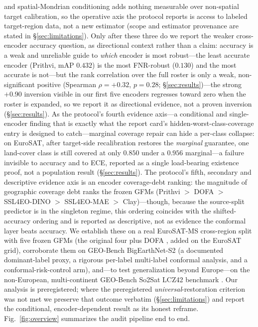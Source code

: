 \documentclass[preprint,11pt,authoryear]{elsarticle}
\begin{document}
and spatial-Mondrian conditioning adds nothing measurable over non-spatial target calibration, so the
operative axis the protocol reports is access to labeled target-region data, not a new estimator (scope
and estimator provenance are stated in \S\ref{sec:limitations}). Only after these three do we report the
weaker cross-encoder accuracy question, as directional context rather than a claim: accuracy is a weak and
unreliable guide to \emph{which} encoder is most robust---the least accurate encoder (Prithvi, mAP $0.432$)
is the most FNR-robust ($0.130$) and the most accurate is not---but the rank correlation over the full
roster is only a weak, non-significant positive (Spearman $\rho=+0.32$, $p{=}0.28$;
\S\ref{sec:results})---the strong $+0.90$ inversion visible in our first five encoders regresses
toward zero when the roster is expanded, so we report it as directional evidence, not a proven inversion
(\S\ref{sec:results}). As the protocol's fourth evidence axis---a conditional and single-encoder finding
that is exactly what the report card's hidden-worst-class-coverage entry is designed to catch---marginal
coverage repair can hide a per-class collapse: on EuroSAT, after target-side recalibration restores the
\emph{marginal} guarantee, one land-cover class is still covered at only $0.850$ under a $0.956$
marginal---a failure invisible to accuracy and to ECE, reported as a single load-bearing existence proof,
not a population result (\S\ref{sec:results}). The protocol's fifth, secondary and descriptive evidence
axis is an encoder coverage-debt ranking: the magnitude of geographic coverage debt ranks the frozen GFMs
(Prithvi $>$ DOFA \citep{xiong2024dofa} $>$ SSL4EO-DINO $>$ SSL4EO-MAE $>$ Clay)---though, because the
source-split predictor is in the singleton regime, this ordering coincides with the shifted-accuracy
ordering and is reported as descriptive, not as evidence the conformal layer beats accuracy. We establish
these on a real EuroSAT-MS \citep{helber2019eurosat} cross-region split with five frozen GFMs (the
original four plus DOFA \citep{xiong2024dofa}, added on the EuroSAT grid), corroborate them on GEO-Bench
BigEarthNet-S2 \citep{lacoste2023geobench,sumbul2019bigearthnet} (a documented dominant-label proxy, a
rigorous per-label multi-label conformal analysis, and a conformal-risk-control arm), and---to test
generalization beyond Europe---on the non-European, multi-continent GEO-Bench So2Sat LCZ42 benchmark
\citep{zhu2020so2sat}. Our analysis is preregistered; where the preregistered \emph{universal}-restoration
criterion was not met we preserve that outcome verbatim (\S\ref{sec:limitations}) and report the
conditional, encoder-dependent result as its honest reframe. Fig.~\ref{fig:overview} summarizes the audit
pipeline end to end.
\end{document}
